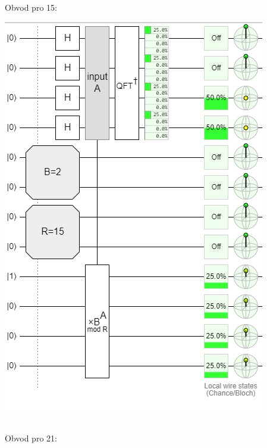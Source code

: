 \documentclass[12pt, a4paper]{article}
\begin{document}
Obvod pro 15:
\begin{center}
\includegraphics{4/15.png}
\end{center}\\
Obvod pro 21:
\end{document}
